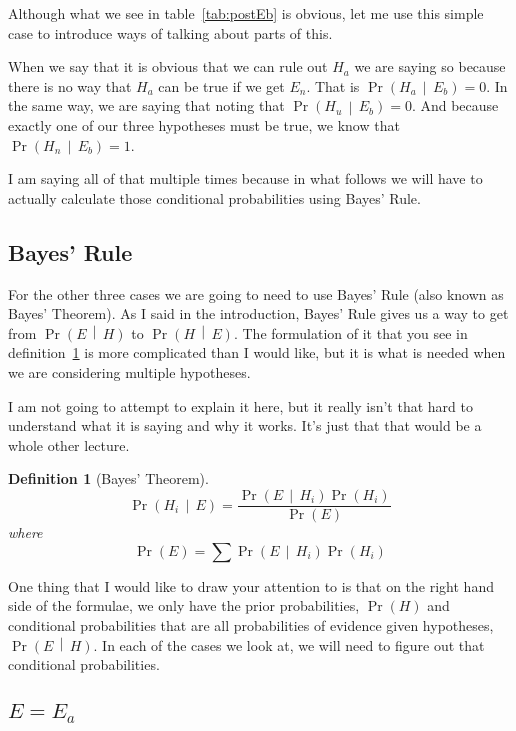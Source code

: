 \documentclass[11pt]{article}
\newcommand{\prob}[1]{\ensuremath{\operatorname{Pr}\left( #1 \right)}}
\newcommand{\condprob}[2]{\prob{#1\, \middle|\, #2}}
\newtheorem{definition}{Definition}
\begin{document}
Although what we see in table~\ref{tab:postEb} is obvious, let me use this simple case to introduce ways of talking about parts of this.

When we say that it is obvious that we can rule out $H_a$ we are saying so because there is no way that $H_a$ can be true if we get $E_n$.
That is $\condprob{H_a}{E_b} = 0$.
In the same way, we are saying that noting that $\condprob{H_u}{E_b} = 0$.
And because exactly one of our three hypotheses must be true, we know that 
$\condprob{H_n}{E_b} = 1$.

I am saying all of that multiple times because in what follows
we will have to actually calculate those conditional probabilities using Bayes' Rule.

\subsection{Bayes' Rule}

For the other three cases we are going to need to use Bayes' Rule (also known as Bayes' Theorem).
As I said in the introduction, Bayes' Rule gives us a way to get from
\condprob{E}{H} to \condprob{H}{E}.
The formulation of it that you see in definition~\ref{def:bayes} is more complicated than I would like, but it is what is needed when we are considering multiple hypotheses.

I am not going to attempt to explain it here, but it really isn't that hard to understand what it is saying and why it works. It's just that that would be a whole other lecture. 

\begin{definition}[Bayes' Theorem]\label{def:bayes}
\begin{equation}\label{eq:bayesH}
    \condprob{H_i}{E} = \frac{\condprob{E}{H_i}\prob{H_i}}{\prob{E}}
\end{equation}
where
\begin{equation}\label{eq:ProbE}
    \prob{E} = \sum \condprob{E}{H_i}\prob{H_i}
\end{equation}
\end{definition}

One thing that I would like to draw your attention to is that on the right hand side of the formulae, we only have the prior probabilities, \prob{H} and conditional probabilities that are all probabilities of evidence given hypotheses, \condprob{E}{H}.
In each of the cases we look at, we will need to figure out that conditional probabilities.  

\subsection{\(E = E_a\)}
\end{document}

